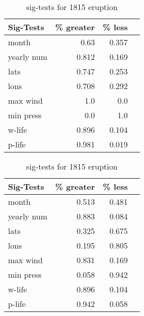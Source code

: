 \begin{table}[!tbp]
\centering
\begin{minipage}[b]{0.45\textwidth}
\begin{tabular}{lrrr}
\toprule
             Sig-Tests & \% greater &  \% less \\

\midrule

month & 0.63 & 0.357 \\
yearly num & 0.812 & 0.169 \\
lats & 0.747 & 0.253 \\
lons & 0.708 & 0.292 \\
max wind & 1.0 & 0.0 \\
min press & 0.0 & 1.0 \\
w-life & 0.896 & 0.104 \\
p-life & 0.981 & 0.019 \\

\bottomrule
\end{tabular}
\caption{sig-tests for 1213 eruption}
\label{sig_1213}
\end{minipage}
\hfill
\begin{minipage}[b]{0.45\textwidth}
\begin{tabular}{lrrr}
\toprule
             Sig-Tests & \% greater &  \% less \\
\midrule

month & 0.513 & 0.481 \\
yearly num & 0.883 & 0.084 \\
lats & 0.325 & 0.675 \\
lons & 0.195 & 0.805 \\
max wind & 0.831 & 0.169 \\
min press & 0.058 & 0.942 \\
w-life & 0.896 & 0.104 \\
p-life & 0.942 & 0.058 \\

\bottomrule
\end{tabular}
\caption{sig-tests for 1815 eruption}
\label{sig_1815}
\end{minipage}
\end{table}



